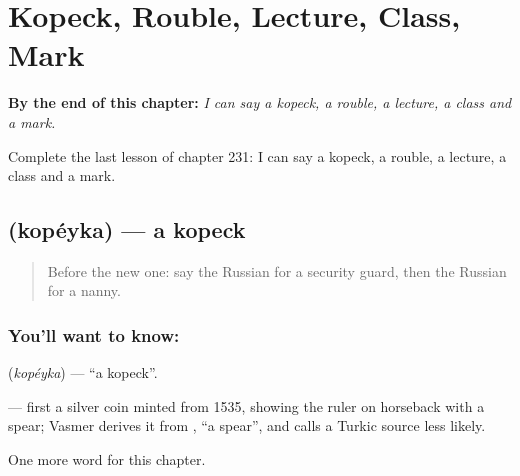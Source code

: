 
\chapter{Kopeck, Rouble, Lecture, Class, Mark}
\label{ch:ru-kopeck-rouble-lecture-class-mark}

\begin{chapteropening}
\textbf{By the end of this chapter:} \emph{I can say a kopeck, a rouble, a lecture, a class and a mark.}

Complete the last lesson of chapter 231: I can say a kopeck, a rouble, a lecture, a class and a mark.
\end{chapteropening}

\section[\texorpdfstring{\ru{копейка} (kopéyka)}{копейка (kopéyka)}]{ (kopéyka) — a kopeck}

\label{lesson:RU-C231-kopeyka}



\begin{quote}
Before the new one: say the Russian for a security guard, then the Russian for a nanny.
\end{quote}

\subsection*{You'll want to know: }
\textbf{} (\emph{kopéyka}) — \textquotedblleft{}a kopeck\textquotedblright{}.

\begin{cousinweb}
\textbf{} — first a silver coin minted from 1535, showing the ruler on horseback with a spear; Vasmer derives it from \emph{}, \textquotedblleft{}a spear\textquotedblright{}, and calls a Turkic source less likely.
\end{cousinweb}

\begin{grammarlens}[title={What you've built}]
One more word for this chapter.
\end{grammarlens}

